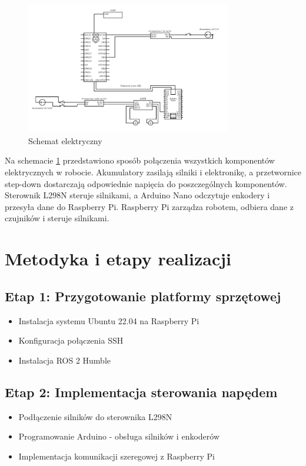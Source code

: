 \documentclass[a4paper,twoside,12pt]{book}
\begin{document}
\newpage
\begin{figure}[!hb]
	\centering
	\includegraphics[width=0.8\textwidth]{images/circuit.png}
	\caption{Schemat elektryczny}
	\label{fig:schemat-elektryczny}
	\end{figure}
Na schemacie \ref{fig:schemat-elektryczny} przedstawiono sposób połączenia wszystkich komponentów elektrycznych w robocie. Akumulatory zasilają silniki i elektronikę, a przetwornice step-down dostarczają odpowiednie napięcia do poszczególnych komponentów. Sterownik L298N steruje silnikami, a Arduino Nano odczytuje enkodery i przesyła dane do Raspberry Pi. Raspberry Pi zarządza robotem, odbiera dane z czujników i steruje silnikami. 
\newpage

\section{Metodyka i etapy realizacji}
\subsection{Etap 1: Przygotowanie platformy sprzętowej}
\begin{itemize}
\item Instalacja systemu Ubuntu 22.04 na Raspberry Pi
\item Konfiguracja połączenia SSH
\item Instalacja ROS 2 Humble
\end{itemize}

\subsection{Etap 2: Implementacja sterowania napędem}
\begin{itemize}
\item Podłączenie silników do sterownika L298N
\item Programowanie Arduino - obsługa silników i enkoderów
\item Implementacja komunikacji szeregowej z Raspberry Pi
\end{itemize}
\end{document}
